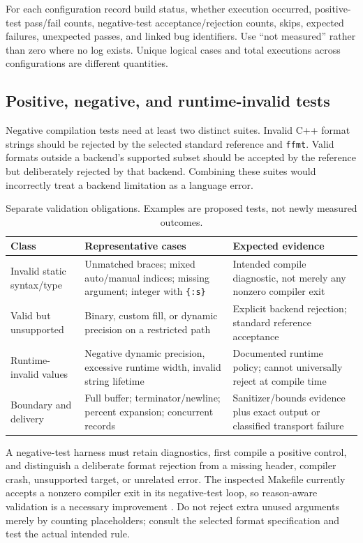 \documentclass[11pt,letterpaper]{article}
\newcommand{\ffmt}{\texttt{ffmt}}
\begin{document}
For each configuration record build status, whether execution occurred,
positive-test pass/fail counts, negative-test acceptance/rejection counts,
skips, expected failures, unexpected passes, and linked bug identifiers.
Use ``not measured'' rather than zero where no log exists. Unique logical
cases and total executions across configurations are different quantities.

\subsection{Positive, negative, and runtime-invalid tests}

Negative compilation tests need at least two distinct suites. Invalid C++
format strings should be rejected by the selected standard reference and
\ffmt. Valid formats outside a backend's supported subset should be accepted
by the reference but deliberately rejected by that backend. Combining these
suites would incorrectly treat a backend limitation as a language error.

\begin{table}[!htbp]
\centering\small
\begin{tabularx}{\linewidth}{@{}P{3.0cm} Y Y@{}}
\toprule
Class & Representative cases & Expected evidence \\
\midrule
Invalid static syntax/type & Unmatched braces; mixed auto/manual indices; missing argument; integer with \texttt{\{:s\}} & Intended compile diagnostic, not merely any nonzero compiler exit \\
Valid but unsupported & Binary, custom fill, or dynamic precision on a restricted path & Explicit backend rejection; standard reference acceptance \\
Runtime-invalid values & Negative dynamic precision, excessive runtime width, invalid string lifetime & Documented runtime policy; cannot universally reject at compile time \\
Boundary and delivery & Full buffer; terminator/newline; percent expansion; concurrent records & Sanitizer/bounds evidence plus exact output or classified transport failure \\
\bottomrule
\end{tabularx}
\caption{Separate validation obligations. Examples are proposed tests, not
newly measured outcomes.}
\label{tab:negative}
\end{table}

A negative-test harness must retain diagnostics, first compile a positive
control, and distinguish a deliberate format rejection from a missing header,
compiler crash, unsupported target, or unrelated error. The inspected Makefile
currently accepts a nonzero compiler exit in its negative-test loop, so
reason-aware validation is a necessary improvement \cite{ffmt-makefile}.
Do not reject extra unused arguments merely by counting placeholders; consult
the selected format specification and test the actual intended rule.
\end{document}
